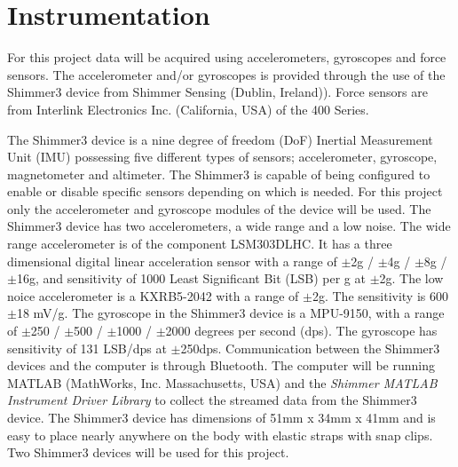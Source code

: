 \section{Instrumentation} \label{methods:instrumentation}

For this project data will be acquired using accelerometers, gyroscopes and force sensors. The accelerometer and/or gyroscopes is provided through the use of the Shimmer3 device from Shimmer Sensing (Dublin, Ireland)). Force sensors are from Interlink Electronics Inc. (California, USA) of the 400 Series. %

The Shimmer3 device is a nine degree of freedom (DoF) Inertial Measurement Unit (IMU) possessing five different types of sensors; accelerometer, gyroscope, magnetometer and altimeter. The Shimmer3 is capable of being configured to enable or disable specific sensors depending on which is needed. For this project only the accelerometer and gyroscope modules of the device will be used. The Shimmer3 device has two accelerometers, a wide range and a low noise. The wide range accelerometer is of the component LSM303DLHC. It has a three dimensional digital linear acceleration sensor with a range of $\pm$2g / $\pm$4g / $\pm$8g / $\pm$16g, and sensitivity of 1000 Least Significant Bit (LSB) per g at $\pm$2g. \cite{LSM303DLHC, ShimmerSensing2016} %
The low noice accelerometer is a KXRB5-2042 with a range of $\pm$2g. The sensitivity is 600$\pm$18 mV/g. \cite{ShimmerSensing2016}
The gyroscope in the Shimmer3 device is a MPU-9150, with a range of $\pm$250 / $\pm$500 / $\pm$1000 / $\pm$2000 degrees per second (dps). The gyroscope has sensitivity of 131 LSB/dps at $\pm$250dps. \cite{ShimmerSensing2016}
Communication between the Shimmer3 devices and the computer is through Bluetooth. The computer will be running MATLAB (MathWorks, Inc. Massachusetts, USA) and the \textit{Shimmer MATLAB Instrument Driver Library} to collect the streamed data from the Shimmer3 device. 
The Shimmer3 device has dimensions of 51mm x 34mm x 41mm and is easy to place nearly anywhere on the body with elastic straps with snap clips. Two Shimmer3 devices will be used for this project. 


